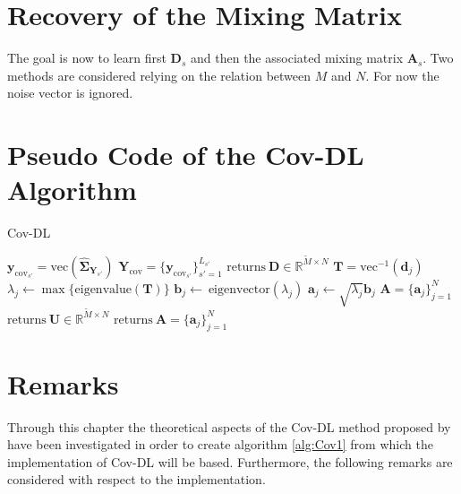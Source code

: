 \section{Recovery of the Mixing Matrix}
The goal is now to learn first $\mathbf{D}_s$ and then the associated mixing matrix $\mathbf{A}_s$. 
Two methods are considered relying on the relation between $M$ and $N$. 
For now the noise vector is ignored.




\section{Pseudo Code of the Cov-DL Algorithm}\label{seg:alg_cov}
\begin{algorithm}[H]
\caption{Cov-DL}
\begin{algorithmic}[1]
				\State$\textbf{y}_{\text{cov}_{s'}} = \text{vec}\left( \widehat{\boldsymbol{\Sigma}}_{\mathbf{Y}_{s'}} \right)$	
			\EndFor			
			\State$\textbf{Y}_{\text{cov}} = \{\textbf{y}_{\text{cov}_{s'}}\}_{s'=1}^{L_{s'}}$
			\State
			\State$\text{returns} \ \textbf{D} \in \mathbb{R}^{\widetilde{M}\times N}$
			\EndProcedure
			\State$\textbf{T} = \text{vec}^{-1}(\textbf{d}_j)$            
			\State$\lambda_j\gets \max\{\text{eigenvalue}(\textbf{T})\}$
			\State$\textbf{b}_j \gets \ \text{eigenvector}(\lambda_j)$
			\State$\textbf{a}_j \gets \sqrt{\lambda_j}\textbf{b}_j$
			\EndFor
			\State$\textbf{A} = \{\textbf{a}_j\}_{j=1}^N$
			\EndIf
			\State
				\State$\text{returns} \ \textbf{U}\in \mathbb{R}^{\widetilde{M}\times N}$
				\EndProcedure
				\State$\text{returns}\ \textbf{A}= \{\textbf{a}_j\}_{j=1}^{N}$
				\EndProcedure
			\EndIf
           \EndProcedure
        \end{algorithmic} 
        \label{alg:Cov1}
\end{algorithm}

\section{Remarks}
Through this chapter the theoretical aspects of the Cov-DL method proposed by \cite{Balkan2015} have been investigated in order to create algorithm \ref{alg:Cov1} from which the implementation of Cov-DL will be based. Furthermore, the following remarks are considered with respect to the implementation. 

